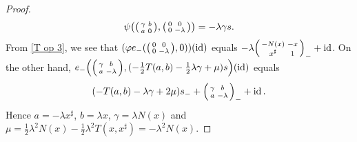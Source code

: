 \documentclass[oneside,a4paper]{amsart} %
\theoremstyle{definition}
\DeclareMathOperator{\id}{id}
\numberwithin{equation}{section}
\begin{document}
\begin{proof}
	\[ \psi \bigl( \begin{psmallmatrix} \gamma &b\\a&0 \end{psmallmatrix},\begin{psmallmatrix} 0 &0\\0&-\lambda \end{psmallmatrix} \bigr) = -\lambda\gamma s.\]
	From \cref{T op 3}, we see that $(\varphi e_-(\begin{psmallmatrix} 0 &0\\0&-\lambda \end{psmallmatrix},0))(\id)$ equals $-\lambda \begin{psmallmatrix} -N(x) &-x\\x^\sharp& 1 \end{psmallmatrix}_-+\id$.
	On the other hand, $e_- \Bigl( \begin{psmallmatrix} \gamma &b\\a&-\lambda \end{psmallmatrix},(-\frac{1}{2}T(a,b)-\frac{1}{2}\lambda\gamma+\mu)s \Bigr)(\id)$ equals
	\[ (-T(a,b)-\lambda\gamma+2\mu)s_-+\begin{psmallmatrix} \gamma &b\\a&-\lambda \end{psmallmatrix}_-+\id.\]
	Hence $a=-\lambda x^\sharp$, $b=\lambda x$, $\gamma=\lambda N(x)$ and $\mu=\frac{1}{2}\lambda^2N(x)-\frac{1}{2}\lambda^2 T(x,x^\sharp)=-\lambda^2N(x)$.
\end{proof}
\end{document}
